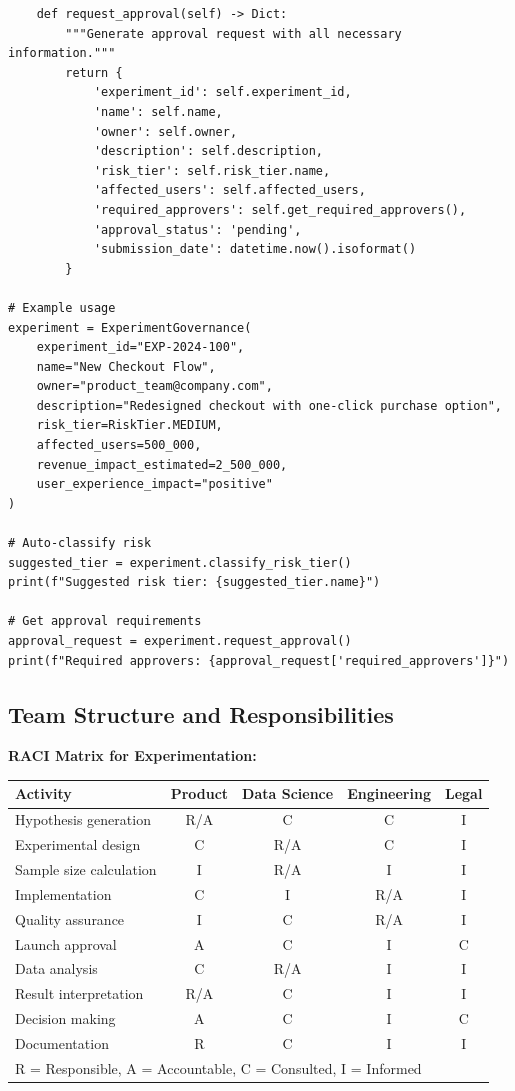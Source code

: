 \begin{lstlisting}
    def request_approval(self) -> Dict:
        """Generate approval request with all necessary information."""
        return {
            'experiment_id': self.experiment_id,
            'name': self.name,
            'owner': self.owner,
            'description': self.description,
            'risk_tier': self.risk_tier.name,
            'affected_users': self.affected_users,
            'required_approvers': self.get_required_approvers(),
            'approval_status': 'pending',
            'submission_date': datetime.now().isoformat()
        }

# Example usage
experiment = ExperimentGovernance(
    experiment_id="EXP-2024-100",
    name="New Checkout Flow",
    owner="product_team@company.com",
    description="Redesigned checkout with one-click purchase option",
    risk_tier=RiskTier.MEDIUM,
    affected_users=500_000,
    revenue_impact_estimated=2_500_000,
    user_experience_impact="positive"
)

# Auto-classify risk
suggested_tier = experiment.classify_risk_tier()
print(f"Suggested risk tier: {suggested_tier.name}")

# Get approval requirements
approval_request = experiment.request_approval()
print(f"Required approvers: {approval_request['required_approvers']}")
\end{lstlisting}

\subsection{Team Structure and Responsibilities}

\textbf{RACI Matrix for Experimentation:}

\begin{center}
\small
\begin{tabular}{lcccc}
\toprule
\textbf{Activity} & \textbf{Product} & \textbf{Data Science} & \textbf{Engineering} & \textbf{Legal} \\
\midrule
Hypothesis generation & R/A & C & C & I \\
Experimental design & C & R/A & C & I \\
Sample size calculation & I & R/A & I & I \\
Implementation & C & I & R/A & I \\
Quality assurance & I & C & R/A & I \\
Launch approval & A & C & I & C \\
Data analysis & C & R/A & I & I \\
Result interpretation & R/A & C & I & I \\
Decision making & A & C & I & C \\
Documentation & R & C & I & I \\
\bottomrule
\multicolumn{5}{l}{\footnotesize R = Responsible, A = Accountable, C = Consulted, I = Informed}
\end{tabular}
\end{center}

